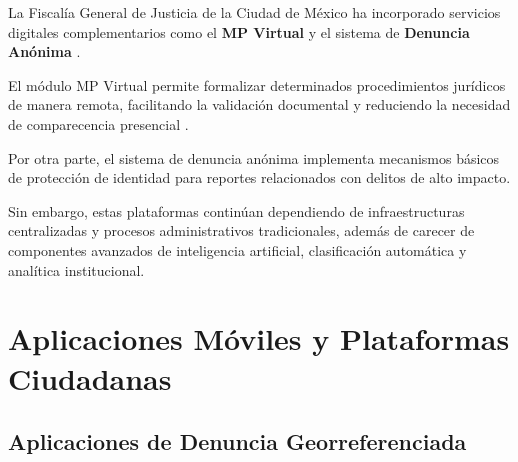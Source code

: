 \begin{flushleft}
\justifying

La Fiscalía General de Justicia de la Ciudad de México ha incorporado servicios digitales complementarios como el \textbf{MP Virtual} y el sistema de \textbf{Denuncia Anónima} \cite{11}.

El módulo MP Virtual permite formalizar determinados procedimientos jurídicos de manera remota, facilitando la validación documental y reduciendo la necesidad de comparecencia presencial \cite{12}.

Por otra parte, el sistema de denuncia anónima implementa mecanismos básicos de protección de identidad para reportes relacionados con delitos de alto impacto.

Sin embargo, estas plataformas continúan dependiendo de infraestructuras centralizadas y procesos administrativos tradicionales, además de carecer de componentes avanzados de inteligencia artificial, clasificación automática y analítica institucional.

\end{flushleft}


\section{Aplicaciones Móviles y Plataformas Ciudadanas}


\subsection{Aplicaciones de Denuncia Georreferenciada}

